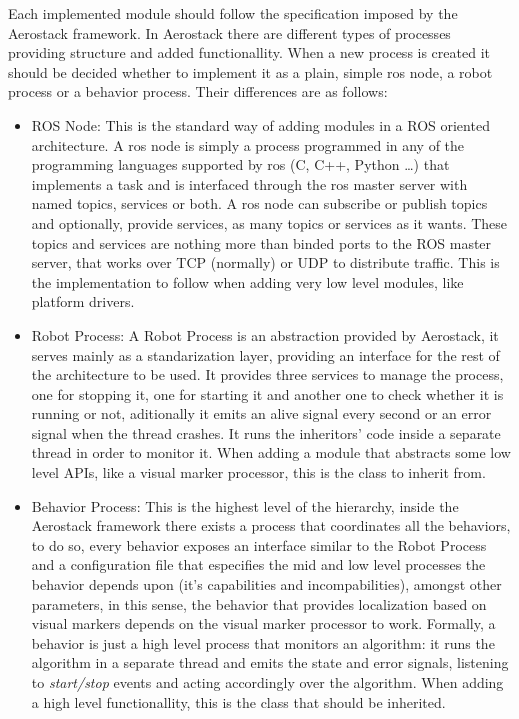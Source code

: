  Each implemented module should follow the specification imposed by the Aerostack framework. In Aerostack there are different types of processes providing structure and added functionallity. When a new process is created it should be decided whether to implement it as a plain, simple ros node, a robot process or a behavior process. Their differences are as follows:

  \begin{itemize}
    \item ROS Node: This is the standard way of adding modules in a ROS oriented architecture. A ros node is simply a process programmed in any of the programming languages supported by ros (C, C++, Python \dots) that implements a task and is interfaced through the ros master server with named topics, services or both. A ros node can subscribe or publish topics and optionally, provide services, as many topics or services as it wants. These topics and services are nothing more than binded ports to the ROS master server, that works over TCP (normally) or UDP to distribute traffic. This is the implementation to follow when adding very low level modules, like platform drivers.
    \item Robot Process: A Robot Process is an abstraction provided by Aerostack, it serves mainly as a standarization layer, providing an interface for the rest of the architecture to be used. It provides three services to manage the process, one for stopping it, one for starting it and another one to check whether it is running or not, aditionally it emits an alive signal every second or an error signal when the thread crashes. It runs the inheritors' code inside a separate thread in order to monitor it. When adding a module that abstracts some low level APIs, like a visual marker processor, this is the class to inherit from.
    \item Behavior Process: This is the highest level of the hierarchy, inside the Aerostack framework there exists a process that coordinates all the behaviors, to do so, every behavior exposes an interface similar to the Robot Process and a configuration file that especifies the mid and low level processes the behavior depends upon (it's capabilities and incompabilities), amongst other parameters, in this sense, the behavior that provides localization based on visual markers depends on the visual marker processor to work. Formally, a behavior is just a high level process that monitors an algorithm: it runs the algorithm in a separate thread and emits the state and error signals, listening to \textit{start/stop} events and acting accordingly over the algorithm. When adding a high level functionallity, this is the class that should be inherited.
  \end{itemize}

